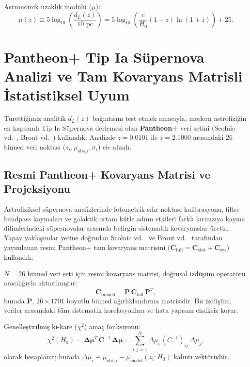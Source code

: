 \documentclass[11pt,a4paper]{article}
\begin{document}
Astronomik uzaklık modülü ($\mu$):
\begin{equation}
    \mu(z) \equiv 5 \log_{10}\left( \frac{d_L(z)}{10\text{ pc}} \right) = 5 \log_{10}\left( \frac{c}{H_0} (1+z) \ln(1+z) \right) + 25.
    \label{eq:uzaklik_modulu_formulu}
\end{equation}

\section{Pantheon+ Tip Ia Süpernova Analizi ve Tam Kovaryans Matrisli İstatistiksel Uyum}
\label{sec:pantheon_analizi}

Türettiğimiz analitik $d_L(z)$ bağıntısını test etmek amacıyla, modern astrofiziğin en kapsamlı Tip Ia Süpernova derlemesi olan \textbf{Pantheon+} veri setini (Scolnic vd.~\cite{pantheon_scolnic}, Brout vd.~\cite{pantheon_brout}) kullandık. Analizde $z = 0.0101$ ile $z = 2.1000$ arasındaki 26 binned veri noktası ($z_i, \mu_{\mathrm{obs},i}, \sigma_i$) ele alındı.

\subsection{Resmi Pantheon+ Kovaryans Matrisi ve Projeksiyonu}
Astrofiziksel süpernova analizlerinde fotometrik sıfır noktası kalibrasyonu, filtre bandpass kaymaları ve galaktik ortam kütle adımı etkileri farklı kırmızıya kayma dilimlerindeki süpernovalar arasında belirgin sistematik kovaryanslar üretir. Yapay yaklaşımlar yerine doğrudan Scolnic vd.~\cite{pantheon_scolnic} ve Brout vd.~\cite{pantheon_brout} tarafından yayımlanan resmi Pantheon+ tam kovaryans matrisini ($\mathbf{C}_{\mathrm{full}} = \mathbf{C}_{\mathrm{stat}} + \mathbf{C}_{\mathrm{sys}}$) kullandık.

$N=26$ binned veri seti için resmi kovaryans matrisi, doğrusal izdüşüm operatörü aracılığıyla aktarılmıştır:
\begin{equation}
    \mathbf{C}_{\mathrm{binned}} = \mathbf{P} \, \mathbf{C}_{\mathrm{full}} \, \mathbf{P}^T,
    \label{eq:binned_kovaryans_izdusum}
\end{equation}
burada $\mathbf{P}$, $26 \times 1701$ boyutlu binned ağırlıklandırma matrisidir. Bu izdüşüm, veriler arasındaki tüm sistematik korelasyonları ve hata yapısını eksiksiz korur.

Genelleştirilmiş ki-kare ($\chi^2$) amaç fonksiyonu:
\begin{equation}
    \chi^2(H_0) = \boldsymbol{\Delta\mu}^T \, \mathbf{C}^{-1} \, \boldsymbol{\Delta\mu} = \sum_{i,j=1}^{N} \Delta\mu_i \, (C^{-1})_{ij} \, \Delta\mu_j,
    \label{eq:genel_chi2}
\end{equation}
olarak hesaplanır; burada $\Delta\mu_i \equiv \mu_{\mathrm{obs},i} - \mu_{\mathrm{model}}(z_i; H_0)$ kalıntı vektörüdür.
\end{document}
